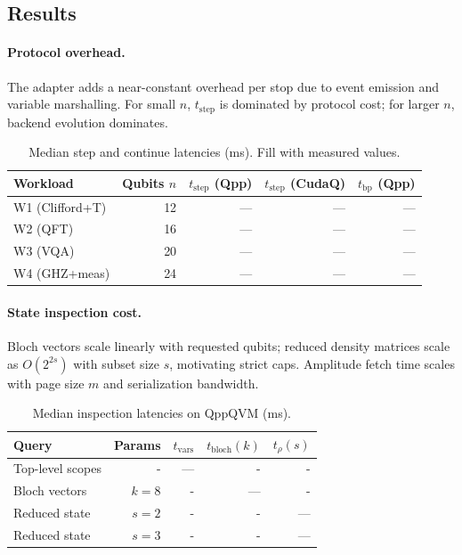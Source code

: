 \documentclass[12pt]{article}
\begin{document}
\begin{itemize}
\subsection{Results}

\paragraph{Protocol overhead.}
The adapter adds a near-constant overhead per stop due to event emission and variable marshalling. For small $n$, $t_{\mathrm{step}}$ is dominated by protocol cost; for larger $n$, backend evolution dominates.

\begin{table}[t]
\centering
\caption{Median step and continue latencies (ms). Fill with measured values.}
\begin{tabular}{lrrrr}
\hline
Workload & Qubits $n$ & $t_{\mathrm{step}}$ (Qpp) & $t_{\mathrm{step}}$ (CudaQ) & $t_{\mathrm{bp}}$ (Qpp) \\
\hline
W1 (Clifford+T) & 12 & --- & --- & --- \\
W2 (QFT)        & 16 & --- & --- & --- \\
W3 (VQA)        & 20 & --- & --- & --- \\
W4 (GHZ+meas)   & 24 & --- & --- & --- \\
\hline
\end{tabular}
\label{tab:latency}
\end{table}

\paragraph{State inspection cost.}
Bloch vectors scale linearly with requested qubits; reduced density matrices scale as $O(2^{2s})$ with subset size $s$, motivating strict caps. Amplitude fetch time scales with page size $m$ and serialization bandwidth.

\begin{table}[t]
\centering
\caption{Median inspection latencies on QppQVM (ms).}
\begin{tabular}{lrrrr}
\hline
Query & Params & $t_{\mathrm{vars}}$ & $t_{\mathrm{bloch}}(k)$ & $t_{\rho}(s)$ \\
\hline
Top-level scopes & - & --- & - & - \\
Bloch vectors & $k=8$ & - & --- & - \\
Reduced state & $s=2$ & - & - & --- \\
Reduced state & $s=3$ & - & - & --- \\
\hline
\end{tabular}
\label{tab:inspect}
\end{table}


\end{itemize}
\end{document}
